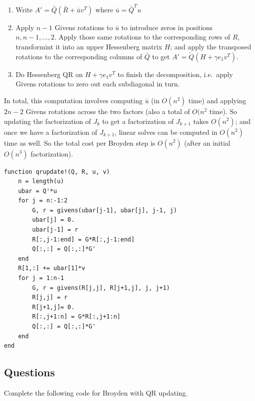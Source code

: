 \documentclass[12pt, leqno]{article} %
\providecommand{\tightlist}{%
  \setlength{\itemsep}{0pt}\setlength{\parskip}{0pt}}
\begin{document}
\begin{enumerate}
\def\labelenumi{\arabic{enumi}.}
\tightlist
\item
  Write \(A' = \bar{Q} (\bar{R} + \bar{u} v^T)\) where
  \(\bar{u} = \bar{Q}^T u\)
\item
  Apply \(n-1\) Givens rotations to \(\bar{u}\) to introduce zeros in
  positions \(n, n-1, \ldots, 2\). Apply those same rotations to the
  corresponding rows of \(R\), transformint it into an upper Hessenberg
  matrix \(H\); and apply the transposed rotations to the corresponding
  columns of \(\bar{Q}\) to get \(A' = \tilde{Q} (H + \gamma e_1 v^T)\).
\item
  Do Hessenberg QR on \(H + \gamma e_1v^T\) to finish the decomposition,
  i.e.~apply Givens rotations to zero out each subdiagonal in turn.
\end{enumerate}

In total, this computation involves computing \(\bar{u}\) (in \(O(n^2)\)
time) and applying \(2n-2\) Givens rotations across the two factors
(also a total of \(O(n^2\) time). So updating the factorization of
\(J_k\) to get a factorization of \(J_{k+1}\) takes \(O(n^2)\); and once
we have a factorization of \(J_{k+1}\), linear solves can be computed in
\(O(n^2)\) time as well. So the total cost per Broyden step is
\(O(n^2)\) (after an initial \(O(n^3)\) factorization).

\begin{verbatim}
function qrupdate!(Q, R, u, v)
    n = length(u)
    ubar = Q'*u
    for j = n:-1:2
        G, r = givens(ubar[j-1], ubar[j], j-1, j)
        ubar[j] = 0.
        ubar[j-1] = r
        R[:,j-1:end] = G*R[:,j-1:end]
        Q[:,:] = Q[:,:]*G'
    end
    R[1,:] += ubar[1]*v
    for j = 1:n-1
        G, r = givens(R[j,j], R[j+1,j], j, j+1)
        R[j,j] = r
        R[j+1,j]= 0.
        R[:,j+1:n] = G*R[:,j+1:n]
        Q[:,:] = Q[:,:]*G'
    end
end
\end{verbatim}

\subsection{Questions}

Complete the following code for Broyden with QR updating.
\end{document}
